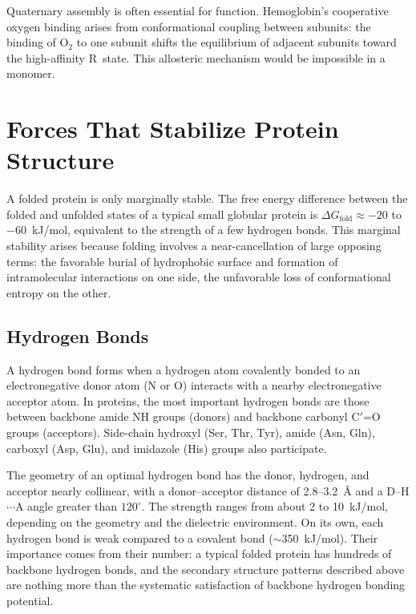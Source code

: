Quaternary assembly is often essential for function.  Hemoglobin's cooperative oxygen binding arises from conformational coupling between subunits: the binding of O$_2$ to one subunit shifts the equilibrium of adjacent subunits toward the high-affinity R~state.  This allosteric mechanism would be impossible in a monomer.


\section{Forces That Stabilize Protein Structure}
\label{sec:forces}

A folded protein is only marginally stable.  The free energy difference between the folded and unfolded states of a typical small globular protein is $\Delta G_{\text{fold}} \approx -20$ to $-60$~kJ/mol, equivalent to the strength of a few hydrogen bonds.  This marginal stability arises because folding involves a near-cancellation of large opposing terms: the favorable burial of hydrophobic surface and formation of intramolecular interactions on one side, the unfavorable loss of conformational entropy on the other.

\subsection{Hydrogen Bonds}
\label{sec:hbonds}

A hydrogen bond forms when a hydrogen atom covalently bonded to an electronegative donor atom (N or O) interacts with a nearby electronegative acceptor atom.  In proteins, the most important hydrogen bonds are those between backbone amide NH groups (donors) and backbone carbonyl C$'$=O groups (acceptors).  Side-chain hydroxyl (Ser, Thr, Tyr), amide (Asn, Gln), carboxyl (Asp, Glu), and imidazole (His) groups also participate.

The geometry of an optimal hydrogen bond has the donor, hydrogen, and acceptor nearly collinear, with a donor--acceptor distance of 2.8--3.2~\AA{} and a D--H$\cdots$A angle greater than $120^\circ$.  The strength ranges from about 2 to 10~kJ/mol, depending on the geometry and the dielectric environment.  On its own, each hydrogen bond is weak compared to a covalent bond ($\sim$350~kJ/mol).  Their importance comes from their number: a typical folded protein has hundreds of backbone hydrogen bonds, and the secondary structure patterns described above are nothing more than the systematic satisfaction of backbone hydrogen bonding potential.

